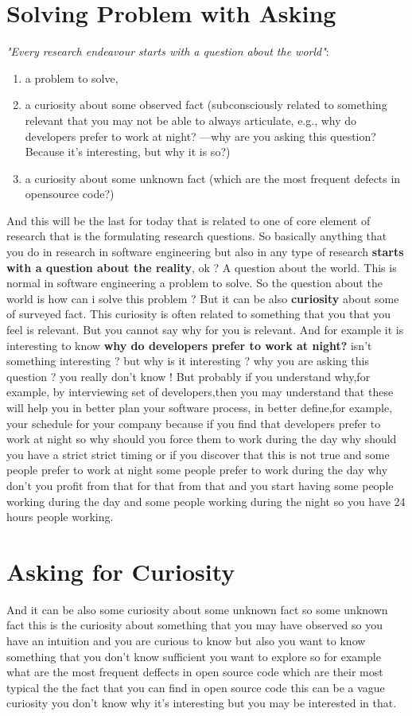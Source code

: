 \documentclass[conference, compsoc, twoside]{IEEEtran}
\begin{document}
\section{Solving Problem with Asking} %
\label{sec:solving_problem_with_asking}
\textit{"Every research endeavour starts with a question about the world"}: 
\begin{enumerate}
	\item a problem to solve,
	\item a curiosity about some observed fact (subconsciously related to something relevant that you may not be able to always articulate, e.g., why do developers prefer to work at night? —why are you asking this question? Because it’s interesting, but why it is so?)
	\item a curiosity about some unknown fact (which are the most frequent defects in opensource code?)
\end{enumerate}
And this will be the last for today that is related to one of core element of research that is the formulating research questions.
So basically anything that you do in research in software engineering but also in any type of research \textbf{starts with a question about the reality}, ok ? 
A question about the world. 
This is normal in software engineering a problem to solve.
So the question about the world is how can i solve this problem ?  
But it can be also \textbf{curiosity} about some of surveyed fact. 
This curiosity is often related to something that you that you feel is relevant.
But you cannot say why for you is relevant.
And for example it is interesting to know \textbf{why do developers prefer to work at night?} 
isn't something interesting ? 
but why is it interesting ?
why you are asking this question ?
you really don't know ! 
But probably if you understand why,for example, by interviewing set of developers,then you may understand that these will help you in better plan your software process, in better define,for example, your schedule for your company because if you find that developers prefer to work at night so why should you force them to work during the day why should you have a strict strict timing or if you discover that this is not true and some people prefer to work at night some people prefer to work during the day why don't you profit from that for that from that and you start having some people working during the day and some people working during the night so you have 24 hours people working.
\section{Asking for Curiosity} %
And it can be also some curiosity about some unknown fact so some unknown fact this is the curiosity about something that you may have observed so you have an intuition and you are curious to know but also you want to know something that you don't know sufficient you want to explore so for example what are the most frequent deffects in open source code which are their most typical the the fact that you can find in open source code this can be a vague curiosity you don't know why it's interesting but you may be interested in that.
\end{document}
